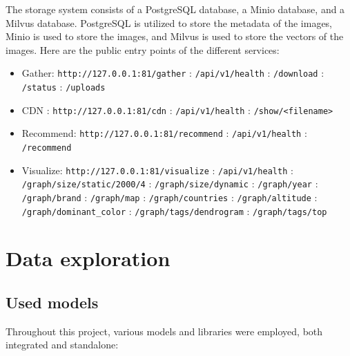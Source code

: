 \documentclass{article}
\begin{document}
    The storage system consists of a PostgreSQL database, a Minio database, and a Milvus database. PostgreSQL is utilized to store the metadata of the images, Minio is used to store the images, and Milvus is used to store the vectors of the images.
    Here are the public entry points of the different services:

    \begin{itemize}
        \item Gather: \texttt{http://127.0.0.1:81/gather}
        \subitem [GET]: \texttt{/api/v1/health}
        \subitem [GET]: \texttt{/download}
        \subitem [GET]: \texttt{/status}
        \subitem [POST]: \texttt{/uploads}
        \item CDN : \texttt{http://127.0.0.1:81/cdn}
        \subitem [GET]: \texttt{/api/v1/health}
        \subitem [GET]: \texttt{/show/<filename>}
        \item Recommend: \texttt{http://127.0.0.1:81/recommend}
        \subitem [GET]: \texttt{/api/v1/health}
        \subitem [POST]: \texttt{/recommend}
        \item Visualize: \texttt{http://127.0.0.1:81/visualize}
        \subitem [GET]: \texttt{/api/v1/health}
        \subitem [GET]: \texttt{/graph/size/static/2000/4}
        \subitem [GET]: \texttt{/graph/size/dynamic}
        \subitem [GET]: \texttt{/graph/year}
        \subitem [GET]: \texttt{/graph/brand}
        \subitem [GET]: \texttt{/graph/map}
        \subitem [GET]: \texttt{/graph/countries}
        \subitem [GET]: \texttt{/graph/altitude}
        \subitem [GET]: \texttt{/graph/dominant_color}
        \subitem [GET]: \texttt{/graph/tags/dendrogram}
        \subitem [GET]: \texttt{/graph/tags/top}
    \end{itemize}


    \section{Data exploration}\label{sec:exploration}

    \subsection{Used models}\label{subsec:models}
    Throughout this project, various models and libraries were employed, both integrated and standalone:
\end{document}
